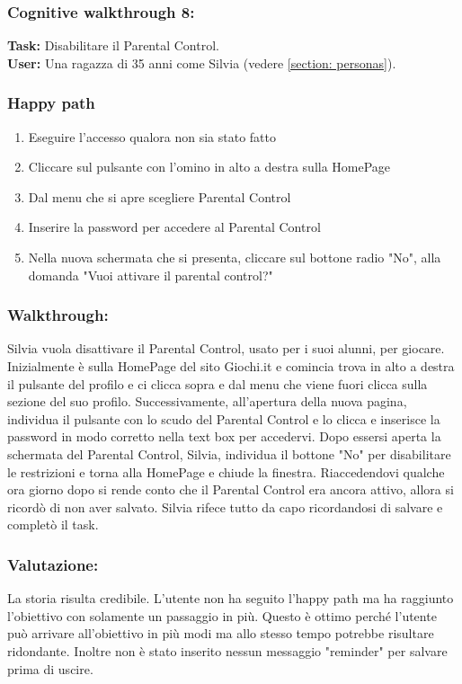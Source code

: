 \documentclass[../Report.tex]{subfiles}
\begin{document}
    \subsubsection{Cognitive walkthrough 8:}
    \textbf{Task:} Disabilitare il Parental Control.\\
    \textbf{User:} Una ragazza di 35 anni come Silvia (vedere \ref{section: personas}).\\

    \subsubsection{Happy path}
    \begin{enumerate}
        \item Eseguire l'accesso qualora non sia stato fatto 
        \item Cliccare sul pulsante con l’omino in alto a destra sulla HomePage
        \item Dal menu che si apre scegliere Parental Control
        \item Inserire la password per accedere al Parental Control 
        \item Nella nuova schermata che si presenta, cliccare sul bottone radio "No", alla domanda "Vuoi attivare il parental control?"
    \end{enumerate}

    \subsubsection{Walkthrough:}
    Silvia vuola disattivare il Parental Control, usato per i suoi alunni, per giocare. Inizialmente è sulla HomePage del sito Giochi.it e comincia trova in alto a destra il pulsante del profilo e ci clicca sopra e dal menu che viene fuori clicca sulla sezione del suo profilo. Successivamente, all'apertura della nuova pagina, individua il pulsante con lo scudo del Parental Control e lo clicca e inserisce la password in modo corretto nella text box per accedervi. Dopo essersi aperta la schermata del Parental Control, Silvia, individua il bottone "No" per disabilitare le restrizioni e torna alla HomePage e chiude la finestra. Riaccedendovi qualche ora giorno dopo si rende conto che il Parental Control era ancora attivo, allora si ricordò di non aver salvato. Silvia rifece tutto da capo ricordandosi di salvare e completò il task.  
    \subsubsection{Valutazione:}
    La storia risulta credibile. L'utente non ha seguito l'happy path ma ha raggiunto l'obiettivo con solamente un passaggio in più. Questo è ottimo perché l'utente può arrivare all'obiettivo in più modi ma allo stesso tempo potrebbe risultare ridondante. Inoltre non è stato inserito nessun messaggio "reminder" per salvare prima di uscire.
\end{document}
